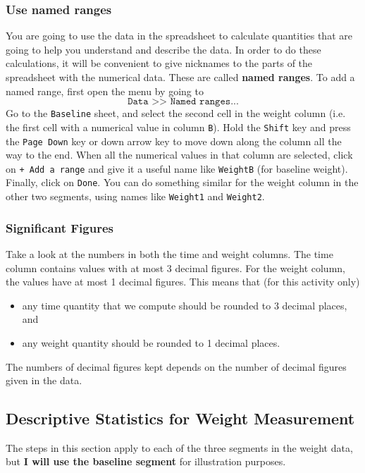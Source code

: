 \subsubsection{Use named ranges}
%
You are going to use the data in the spreadsheet to calculate quantities that are going to help you understand and describe the data. In order to do these calculations, it will be convenient to give nicknames to the parts of the spreadsheet with the numerical data. These are called \textbf{named ranges}. To add a named range, first open the menu by going to
\begin{equation}
    \texttt{Data >> Named ranges...}
\end{equation}
Go to the \texttt{Baseline} sheet, and select the second cell in the weight column (i.e. the first cell with a numerical value in column \texttt{B}). Hold the \texttt{Shift} key and press the \texttt{Page Down} key or down arrow key to move down along the column all the way to the end. When all the numerical values in that column are selected, click on \texttt{+ Add a range} and give it a useful name like \texttt{WeightB} (for baseline weight). Finally, click on \texttt{Done}. You can do something similar for the weight column in the other two segments, using names like \texttt{Weight1} and \texttt{Weight2}.
%
\subsubsection{Significant Figures}
%
Take a look at the numbers in both the time and weight columns. The time column contains values with at most 3 decimal figures. For the weight column, the values have at most 1 decimal figures. This means that (for this activity only)
\begin{itemize}
    \item any time quantity that we compute should be rounded to 3 decimal places, and
    \item any weight quantity should be rounded to 1 decimal places.
\end{itemize}
The numbers of decimal figures kept depends on the number of decimal figures given in the data.
%
\subsection{Descriptive Statistics for Weight Measurement}
%
The steps in this section apply to each of the three segments in the weight data, but \textbf{I will use the baseline segment} for illustration purposes.
%
